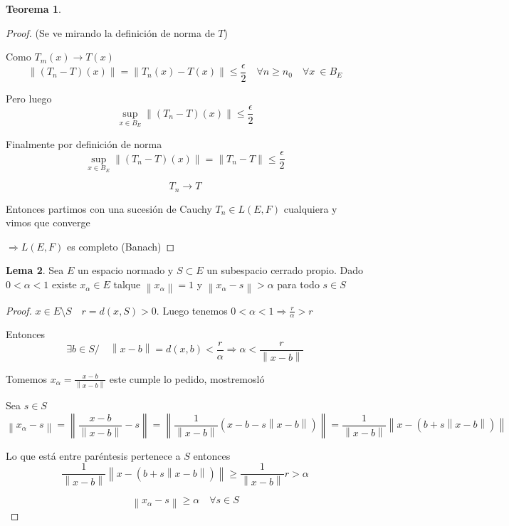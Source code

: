 \documentclass[12pt]{article}
\newcommand{\Ra}{\Rightarrow}
\newcommand{\ra}{\rightarrow}
\newcommand{\norm}[1]{\left\lVert#1\right\rVert}
\theoremstyle{definition}
\newtheorem{theorem}{Teorema}
\newtheorem{lemma}[theorem]{Lema}
\begin{document}
\begin{theorem}
\begin{proof}
    (Se ve mirando la definición de norma de $T$)

  Como $T_{m}(x) \ra T(x)$ 
  $$ \norm {(T_{n} - T)(x)} = \norm{T_{n}(x) - T(x)} \leq \frac{\epsilon}{2} \quad \forall n \geq n_{0} \quad \forall x\ \in B_{E}$$
  
  Pero luego $$\sup_{x \in B_{E}}{\norm{(T_{n} - T)(x)}} \leq \frac{\epsilon}{2} $$

  Finalmente por definición de norma $$ \sup_{x \in B_{E}}{\norm{(T_{n} - T)(x)}} = \norm{T_{n} - T} \leq \frac{\epsilon}{2}$$ 

  $$ T_{n} \ra T$$

  Entonces partimos con una sucesión de Cauchy $T_{n} \in L(E,F)$ cualquiera y vimos que converge

  $\Ra L(E,F)$ es completo (Banach) 
      \end{proof}
	\end{theorem}
	\begin{lemma}
	  Sea $E$ un espacio normado y $S \subset E$ un subespacio cerrado propio. Dado $0 < \alpha < 1$ existe $x_{\alpha} \in E$ talque $\norm{x_{\alpha}} = 1$ y $\norm{x_{\alpha} - s} > \alpha $ para todo $s \in S$ 
	
	  \begin{proof}
	    $x \in E \setminus S \quad r=d(x,S) > 0.$ Luego tenemos  $0 < \alpha < 1 \Ra \frac{r}{\alpha} > r$

	    Entonces $$\exists b \in S / \quad \norm{x - b} = d(x,b) < \frac{r}{\alpha} \Ra \alpha < \frac{r}{\norm{x - b}} $$

	    Tomemos $x_{\alpha} = \frac{x - b}{\norm{x - b}}$ este cumple lo pedido, mostremosló

	  Sea $s \in S$ $$ \norm{x_{\alpha} - s} = \norm{\frac{x-b}{\norm{x-b}} - s} = \norm{\frac{1}{\norm{x - b}}(x -b -s \norm{x -b})} = \frac{1}{\norm{x - b}} \norm{x - (b + s \norm{x - b})}$$ 

	  Lo que está entre paréntesis pertenece a $S$ entonces 
	  $$\frac{1}{\norm{x - b}} \norm{x - (b + s \norm{x - b})} \geq \frac{1}{\norm{x - b}}r > \alpha  $$

	$$ \norm{x_{\alpha} - s} \geq \alpha \quad \forall s \in S $$
	  \end{proof}


	\end{lemma}
\end{document}
